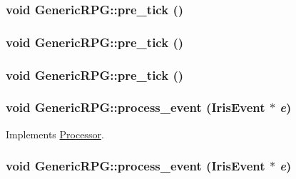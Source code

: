 \hypertarget{classGenericRPG_f6fb1e75e66557481557760c1958612c}{
\subsubsection[{pre\_\-tick}]{\setlength{\rightskip}{0pt plus 5cm}void GenericRPG::pre\_\-tick ()}}
\label{classGenericRPG_f6fb1e75e66557481557760c1958612c}


\hypertarget{classGenericRPG_f6fb1e75e66557481557760c1958612c}{
\subsubsection[{pre\_\-tick}]{\setlength{\rightskip}{0pt plus 5cm}void GenericRPG::pre\_\-tick ()}}
\label{classGenericRPG_f6fb1e75e66557481557760c1958612c}


\hypertarget{classGenericRPG_f6fb1e75e66557481557760c1958612c}{
\subsubsection[{pre\_\-tick}]{\setlength{\rightskip}{0pt plus 5cm}void GenericRPG::pre\_\-tick ()}}
\label{classGenericRPG_f6fb1e75e66557481557760c1958612c}


\hypertarget{classGenericRPG_72d08c87beeb16514c6c81af3296f6af}{
\subsubsection[{process\_\-event}]{\setlength{\rightskip}{0pt plus 5cm}void GenericRPG::process\_\-event ({\bf IrisEvent} $\ast$ {\em e})}}
\label{classGenericRPG_72d08c87beeb16514c6c81af3296f6af}




Implements \hyperlink{classProcessor_18cdeefafbd8225cb3ad18dd098c0e08}{Processor}.\hypertarget{classGenericRPG_72d08c87beeb16514c6c81af3296f6af}{
\subsubsection[{process\_\-event}]{\setlength{\rightskip}{0pt plus 5cm}void GenericRPG::process\_\-event ({\bf IrisEvent} $\ast$ {\em e})}}
\label{classGenericRPG_72d08c87beeb16514c6c81af3296f6af}




